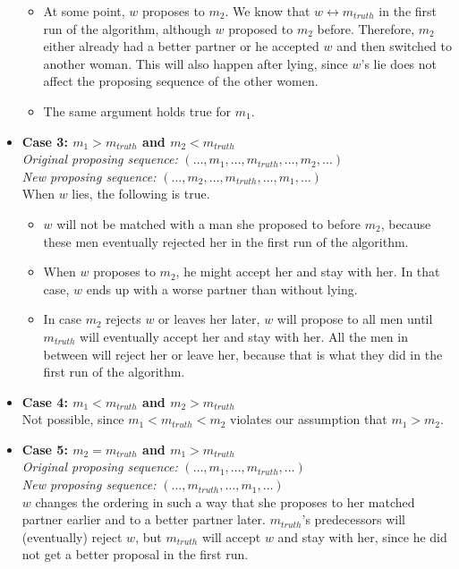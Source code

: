 \documentclass[12pt]{article}
\begin{document}
\begin{itemize}
\begin{itemize}
	\item At some point, $w$ proposes to $m_2$. We know that $w \leftrightarrow m_{\mathit{truth}}$ in the first run of the algorithm, although $w$ proposed to $m_2$ before. Therefore, $m_2$ either already had a better partner or he accepted $w$ and then switched to another woman. This will also happen after lying, since $w$'s lie does not affect the proposing sequence of the other women.
	\item The same argument holds true for $m_1$.
\end{itemize}
	\item \textbf{Case 3: $m_1 > m_{\mathit{truth}}$ and $m_2 < m_{\mathit{truth}}$} \\ 
\emph{Original proposing sequence:} $(\ldots, m_1, \ldots, m_{\mathit{truth}}, \ldots, m_2, \ldots)$ \\ 
\emph{New proposing sequence:} $(\ldots, m_2, \ldots, m_{\mathit{truth}}, \ldots, m_1, \ldots)$ \\
When $w$ lies, the following is true. \begin{itemize}
	\item $w$ will not be matched with a man she proposed to before $m_2$, because these men eventually rejected her in the first run of the algorithm.
	\item When $w$ proposes to $m_2$, he might accept her and stay with her. In that case, $w$ ends up with a worse partner than without lying.
	\item In case $m_2$ rejects $w$ or leaves her later, $w$ will propose to all men until $m_{\mathit{truth}}$ will eventually accept her and stay with her. All the men in between will reject her or leave her, because that is what they did in the first run of the algorithm.
\end{itemize}
	\item \textbf{Case 4: $m_1 < m_{\mathit{truth}}$ and $m_2 > m_{\mathit{truth}}$} \\ Not possible, since $m_1 < m_{\mathit{truth}} < m_2$ violates our assumption that $m_1 > m_2$.
	\item \textbf{Case 5: $m_2 = m_{\mathit{truth}}$ and $m_1 > m_{\mathit{truth}}$} \\ 
\emph{Original proposing sequence:} $(\ldots, m_1, \ldots, m_{\mathit{truth}}, \ldots)$ \\
\emph{New proposing sequence:} $(\ldots, m_{\mathit{truth}}, \ldots, m_1, \ldots)$ \\
$w$ changes the ordering in such a way that she proposes to her matched partner earlier and to a better partner later. $m_{\mathit{truth}}$'s predecessors will (eventually) reject $w$, but $m_{\mathit{truth}}$ will accept $w$ and stay with her, since he did not get a better proposal in the first run.

\end{itemize}
\end{document}
